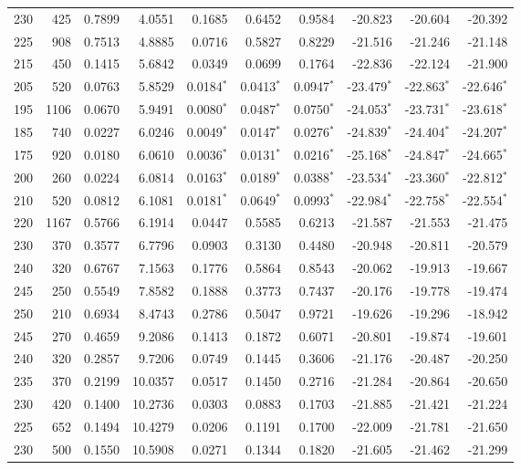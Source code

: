 \begin{landscape}
\begin{footnotesize}
\begin{longtable}{r r r r r r r r r r}
230 & 425 & 0.7899 & 4.0551 & 0.1685 & 0.6452 & 0.9584 & -20.823 & -20.604 & -20.392 \\
225 & 908 & 0.7513 & 4.8885 & 0.0716 & 0.5827 & 0.8229 & -21.516 & -21.246 & -21.148 \\
215 & 450 & 0.1415 & 5.6842 & 0.0349 & 0.0699 & 0.1764 & -22.836 & -22.124 & -21.900 \\
205 & 520 & 0.0763 & 5.8529 & 0.0184$^*$ & 0.0413$^*$ & 0.0947$^*$ & -23.479$^*$ & -22.863$^*$ & -22.646$^*$ \\
195 & 1106 & 0.0670 & 5.9491 & 0.0080$^*$ & 0.0487$^*$ & 0.0750$^*$ & -24.053$^*$ & -23.731$^*$ & -23.618$^*$ \\
185 & 740 & 0.0227 & 6.0246 & 0.0049$^*$ & 0.0147$^*$ & 0.0276$^*$ & -24.839$^*$ & -24.404$^*$ & -24.207$^*$ \\
175 & 920 & 0.0180 & 6.0610 & 0.0036$^*$ & 0.0131$^*$ & 0.0216$^*$ & -25.168$^*$ & -24.847$^*$ & -24.665$^*$ \\
200 & 260 & 0.0224 & 6.0814 & 0.0163$^*$ & 0.0189$^*$ & 0.0388$^*$ & -23.534$^*$ & -23.360$^*$ & -22.812$^*$ \\
210 & 520 & 0.0812 & 6.1081 & 0.0181$^*$ & 0.0649$^*$ & 0.0993$^*$ & -22.984$^*$ & -22.758$^*$ & -22.554$^*$ \\
220 & 1167 & 0.5766 & 6.1914 & 0.0447 & 0.5585 & 0.6213 & -21.587 & -21.553 & -21.475 \\
230 & 370 & 0.3577 & 6.7796 & 0.0903 & 0.3130 & 0.4480 & -20.948 & -20.811 & -20.579 \\
240 & 320 & 0.6767 & 7.1563 & 0.1776 & 0.5864 & 0.8543 & -20.062 & -19.913 & -19.667 \\
245 & 250 & 0.5549 & 7.8582 & 0.1888 & 0.3773 & 0.7437 & -20.176 & -19.778 & -19.474 \\
250 & 210 & 0.6934 & 8.4743 & 0.2786 & 0.5047 & 0.9721 & -19.626 & -19.296 & -18.942 \\
245 & 270 & 0.4659 & 9.2086 & 0.1413 & 0.1872 & 0.6071 & -20.801 & -19.874 & -19.601 \\
240 & 320 & 0.2857 & 9.7206 & 0.0749 & 0.1445 & 0.3606 & -21.176 & -20.487 & -20.250 \\
235 & 370 & 0.2199 & 10.0357 & 0.0517 & 0.1450 & 0.2716 & -21.284 & -20.864 & -20.650 \\
230 & 420 & 0.1400 & 10.2736 & 0.0303 & 0.0883 & 0.1703 & -21.885 & -21.421 & -21.224 \\
225 & 652 & 0.1494 & 10.4279 & 0.0206 & 0.1191 & 0.1700 & -22.009 & -21.781 & -21.650 \\
230 & 500 & 0.1550 & 10.5908 & 0.0271 & 0.1344 & 0.1820 & -21.605 & -21.462 & -21.299 \\

\end{longtable}
\end{footnotesize}
\end{landscape}
